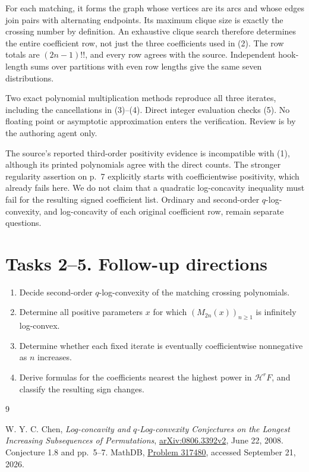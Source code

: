 \documentclass[11pt]{article}
\newcommand{\HH}{\mathcal H}
\begin{document}
For each matching, it forms the graph whose vertices are its
arcs and whose edges join pairs with alternating endpoints.
Its maximum clique size is exactly the crossing number by
definition. An exhaustive clique search therefore determines
the entire coefficient row, not just the three coefficients
used in (2). The row totals are $(2n-1)!!$, and every row agrees
with the source. Independent hook-length sums over partitions
with even row lengths give the same seven distributions.

Two exact polynomial multiplication methods reproduce all
three iterates, including the cancellations in (3)--(4).
Direct integer evaluation checks (5). No floating point or
asymptotic approximation enters the verification. Review is
by the authoring agent only.

The source's reported third-order positivity evidence is
incompatible with (1), although its printed polynomials agree
with the direct counts. The stronger regularity assertion on
p.~7 explicitly starts with coefficientwise positivity, which
already fails here. We do not claim that a quadratic
log-concavity inequality must fail for the resulting signed
coefficient list. Ordinary and second-order $q$-log-convexity,
and log-concavity of each original coefficient row, remain
separate questions.

\section*{Tasks 2--5. Follow-up directions}
\begin{enumerate}[start=2,leftmargin=*]
\item Decide second-order $q$-log-convexity of the matching
crossing polynomials.
\item Determine all positive parameters $x$ for which
$(M_{2n}(x))_{n\ge1}$ is infinitely log-convex.
\item Determine whether each fixed iterate is eventually
coefficientwise nonnegative as $n$ increases.
\item Derive formulas for the coefficients nearest the highest
power in $\HH^rF$, and classify the resulting sign changes.
\end{enumerate}

\begin{thebibliography}{9}
\raggedright
{} W. Y. C. Chen,
\emph{Log-concavity and $q$-Log-convexity Conjectures on the
Longest Increasing Subsequences of Permutations},
\href{https://arxiv.org/abs/0806.3392v2}{arXiv:0806.3392v2},
June 22, 2008. Conjecture 1.8 and pp.~5--7.
 MathDB, \href{https://mathdb.com/p/317480}{Problem 317480},
accessed September 21, 2026.
\end{thebibliography}
\end{document}
